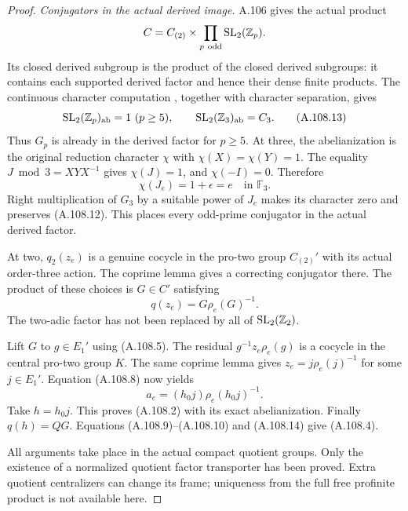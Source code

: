 \begin{proof}
\emph{Conjugators in the actual derived image.}
A.106 gives the actual product
\[
 C=C_{(2)}\times\prod_{p\ {\rm odd}}{\rm SL}_2(\mathbb Z_p).
\]
Its closed derived subgroup is the product of the closed derived
subgroups: it contains each supported derived factor and hence
their dense finite products.
The continuous character computation
\cite[Proposition~5.7(a), printed p.~41]{A_Beyl1986}, together
with character separation, gives
\[
 {\rm SL}_2(\mathbb Z_p)_{\rm ab}=1\ (p\ge5),\qquad
 {\rm SL}_2(\mathbb Z_3)_{\rm ab}=C_3.
 \tag{A.108.13}
\]
Thus \(G_p\) is already in the derived factor for \(p\ge5\).
At three, the abelianization is the original reduction character
\(\chi\) with \(\chi(X)=\chi(Y)=1\). The equality
\(J\bmod3=XYX^{-1}\) gives \(\chi(J)=1\), and \(\chi(-I)=0\).
Therefore
\[
 \chi(J_e)=1+\epsilon=e\quad\text{in }\mathbb F_3.
\]
Right multiplication of \(G_3\) by a suitable power of \(J_e\)
makes its character zero and preserves (A.108.12).
This places every odd-prime conjugator in the actual derived factor.

At two, \(q_2(z_e)\) is a genuine cocycle in the pro-two group
\(C_{(2)}'\) with its actual order-three action.
The coprime lemma gives a correcting conjugator there.
The product of these choices is \(G\in C'\) satisfying
\[
 q(z_e)=G\rho_e(G)^{-1}.
 \tag{A.108.14}
\]
The two-adic factor has not been replaced by all of
\({\rm SL}_2(\mathbb Z_2)\).

Lift \(G\) to \(g\in E_1'\) using (A.108.5). The residual
\(g^{-1}z_e\rho_e(g)\) is a cocycle in the central pro-two group \(K\).
The same coprime lemma gives
\(z_e=j\rho_e(j)^{-1}\) for some \(j\in E_1'\).
Equation (A.108.8) now yields
\[
 a_e=(h_0j)\rho_e(h_0j)^{-1}.
\]
Take \(h=h_0j\). This proves (A.108.2) with its exact abelianization.
Finally \(q(h)=QG\). Equations (A.108.9)--(A.108.10) and
(A.108.14) give (A.108.4).

All arguments take place in the actual compact quotient groups.
Only the existence of a normalized quotient factor transporter
has been proved. Extra quotient centralizers can change its frame;
uniqueness from the full free profinite product is not available here.
\end{proof}


